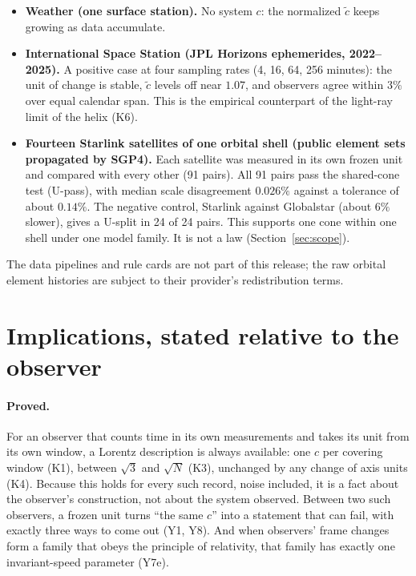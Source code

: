 \documentclass[11pt]{article}
\theoremstyle{definition}
\theoremstyle{plain}
\theoremstyle{remark}
\begin{document}
\begin{itemize}
\item \textbf{Weather (one surface station).} No system $c$: the normalized $\tilde c$ keeps growing as data accumulate.
\item \textbf{International Space Station (JPL Horizons ephemerides, 2022--2025).} A positive case at four sampling rates (4, 16, 64, 256 minutes): the unit of change is stable, $\tilde c$ levels off near $1.07$, and observers agree within $3\%$ over equal calendar span. This is the empirical counterpart of the light-ray limit of the helix (K6).
\item \textbf{Fourteen Starlink satellites of one orbital shell (public element sets propagated by SGP4).} Each satellite was measured in its own frozen unit and compared with every other (91 pairs). All 91 pairs pass the shared-cone test (U-pass), with median scale disagreement $0.026\%$ against a tolerance of about $0.14\%$. The negative control, Starlink against Globalstar (about $6\%$ slower), gives a U-split in 24 of 24 pairs. This supports one cone within one shell under one model family. It is not a law (Section~\ref{sec:scope}).
\end{itemize}
The data pipelines and rule cards are not part of this release; the raw orbital element histories are subject to their provider's redistribution terms.

\section{Implications, stated relative to the observer}\label{sec:implications}

\paragraph{Proved.} For an observer that counts time in its own measurements and takes its unit from its own window, a Lorentz description is always available: one $c$ per covering window (K1), between $\sqrt3$ and $\sqrt N$ (K3), unchanged by any change of axis units (K4). Because this holds for every such record, noise included, it is a fact about the observer's construction, not about the system observed. Between two such observers, a frozen unit turns ``the same $c$'' into a statement that can fail, with exactly three ways to come out (Y1, Y8). And when observers' frame changes form a family that obeys the principle of relativity, that family has exactly one invariant-speed parameter (Y7e).
\end{document}
